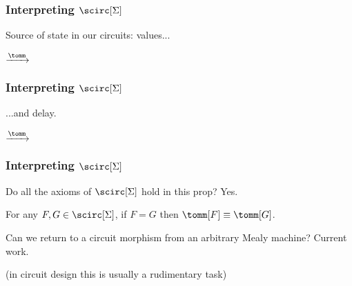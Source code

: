 \begin{frame}
    \frametitle{Interpreting $\scirc[\Sigma]$}    

    Source of \alert{state} in our circuits: \alert{values}...

    \begin{center}
        \qquad
        \pause
        $\xrightarrow{\tomm}$
        \qquad
        \raisebox{-1.25em}{}
    \end{center}
\end{frame}

\begin{frame}
    \frametitle{Interpreting $\scirc[\Sigma]$}    
    ...and \alert{delay}.
    \begin{center}
        \qquad
        \pause
        $\xrightarrow{\tomm}$
        \qquad
        \raisebox{-8em}{}
    \end{center}
\end{frame}


\begin{frame}
    \frametitle{Interpreting $\scirc[\Sigma]$}

    Do all the axioms of $\scirc[\Sigma]$ hold in this prop? \pause \alert{Yes.}

    \pause

    \begin{theorem}
        For any $F,G \in \scirc[\Sigma]$, if $F = G$ then $\tomm[F] \equiv \tomm[G]$.
    \end{theorem}

    \pause

    Can we return to a circuit morphism from an arbitrary Mealy machine? \pause \alert{Current work}.

    \pause

    (in circuit design this is usually a rudimentary task)

\end{frame}